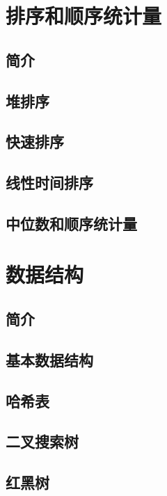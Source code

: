 \documentclass[lang=cn,newtx,10pt,scheme=chinese]{elegantbook}
\begin{document}
\part{排序和顺序统计量}

\chapter*{简介}

\chapter{堆排序}

\chapter{快速排序}

\chapter{线性时间排序}

\chapter{中位数和顺序统计量}

\part{数据结构}

\chapter*{简介}

\chapter{基本数据结构}

\chapter{哈希表}

\chapter{二叉搜索树}

\chapter{红黑树}
\end{document}
